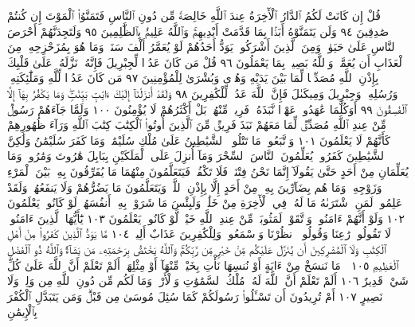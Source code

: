 قُلْ إِن كَانَتْ لَكُمُ ٱلدَّارُ ٱلْأٓخِرَةُ عِندَ ٱللَّهِ خَالِصَةࣰ مِّن
دُونِ ٱلنَّاسِ فَتَمَنَّوُا۟ ٱلْمَوْتَ إِن كُنتُمْ صَٰدِقِينَ ٩٤ وَلَن
يَتَمَنَّوْهُ أَبَدَۢا بِمَا قَدَّمَتْ أَيْدِيهِمْۚ وَٱللَّهُ عَلِيمُۢ بِٱلظَّٰلِمِينَ ٩٥
وَلَتَجِدَنَّهُمْ أَحْرَصَ ٱلنَّاسِ عَلَىٰ حَيَوٰةࣲ وَمِنَ ٱلَّذِينَ أَشْرَكُوا۟ۚ
يَوَدُّ أَحَدُهُمْ لَوْ يُعَمَّرُ أَلْفَ سَنَةࣲ وَمَا هُوَ بِمُزَحْزِحِهِۦ مِنَ
ٱلْعَذَابِ أَن يُعَمَّرَۗ وَٱللَّهُ بَصِيرُۢ بِمَا يَعْمَلُونَ ٩٦ قُلْ مَن
كَانَ عَدُوࣰّا لِّجِبْرِيلَ فَإِنَّهُۥ نَزَّلَهُۥ عَلَىٰ قَلْبِكَ بِإِذْنِ
ٱللَّهِ مُصَدِّقࣰا لِّمَا بَيْنَ يَدَيْهِ وَهُدࣰى وَبُشْرَىٰ لِلْمُؤْمِنِينَ ٩٧
مَن كَانَ عَدُوࣰّا لِّلَّهِ وَمَلَٰٓئِكَتِهِۦ وَرُسُلِهِۦ وَجِبْرِيلَ
وَمِيكَىٰلَ فَإِنَّ ٱللَّهَ عَدُوࣱّ لِّلْكَٰفِرِينَ ٩٨ وَلَقَدْ أَنزَلْنَآ
إِلَيْكَ ءَايَٰتِۭ بَيِّنَٰتࣲۖ وَمَا يَكْفُرُ بِهَآ إِلَّا ٱلْفَٰسِقُونَ ٩٩
أَوَكُلَّمَا عَٰهَدُوا۟ عَهْدࣰا نَّبَذَهُۥ فَرِيقࣱ مِّنْهُمۚ بَلْ أَكْثَرُهُمْ
لَا يُؤْمِنُونَ ١٠٠ وَلَمَّا جَآءَهُمْ رَسُولࣱ مِّنْ عِندِ ٱللَّهِ مُصَدِّقࣱ
لِّمَا مَعَهُمْ نَبَذَ فَرِيقࣱ مِّنَ ٱلَّذِينَ أُوتُوا۟ ٱلْكِتَٰبَ
كِتَٰبَ ٱللَّهِ وَرَآءَ ظُهُورِهِمْ كَأَنَّهُمْ لَا يَعْلَمُونَ ١٠١
وَٱتَّبَعُوا۟ مَا تَتْلُوا۟ ٱلشَّيَٰطِينُ عَلَىٰ مُلْكِ سُلَيْمَٰنَۖ وَمَا كَفَرَ
سُلَيْمَٰنُ وَلَٰكِنَّ ٱلشَّيَٰطِينَ كَفَرُوا۟ يُعَلِّمُونَ ٱلنَّاسَ
ٱلسِّحْرَ وَمَآ أُنزِلَ عَلَى ٱلْمَلَكَيْنِ بِبَابِلَ هَٰرُوتَ وَمَٰرُوتَۚ
وَمَا يُعَلِّمَانِ مِنْ أَحَدٍ حَتَّىٰ يَقُولَآ إِنَّمَا نَحْنُ فِتْنَةࣱ فَلَا
تَكْفُرْۖ فَيَتَعَلَّمُونَ مِنْهُمَا مَا يُفَرِّقُونَ بِهِۦ بَيْنَ ٱلْمَرْءِ
وَزَوْجِهِۦۚ وَمَا هُم بِضَآرِّينَ بِهِۦ مِنْ أَحَدٍ إِلَّا بِإِذْنِ ٱللَّهِۚ
وَيَتَعَلَّمُونَ مَا يَضُرُّهُمْ وَلَا يَنفَعُهُمْۚ وَلَقَدْ عَلِمُوا۟ لَمَنِ
ٱشْتَرَىٰهُ مَا لَهُۥ فِي ٱلْأٓخِرَةِ مِنْ خَلَٰقࣲۚ وَلَبِئْسَ مَا شَرَوْا۟ بِهِۦٓ
أَنفُسَهُمْۚ لَوْ كَانُوا۟ يَعْلَمُونَ ١٠٢ وَلَوْ أَنَّهُمْ ءَامَنُوا۟ وَٱتَّقَوْا۟
لَمَثُوبَةࣱ مِّنْ عِندِ ٱللَّهِ خَيْرࣱۚ لَّوْ كَانُوا۟ يَعْلَمُونَ ١٠٣
يَٰٓأَيُّهَا ٱلَّذِينَ ءَامَنُوا۟ لَا تَقُولُوا۟ رَٰعِنَا وَقُولُوا۟ ٱنظُرْنَا
وَٱسْمَعُوا۟ۗ وَلِلْكَٰفِرِينَ عَذَابٌ أَلِيمࣱ ١٠٤ مَّا يَوَدُّ
ٱلَّذِينَ كَفَرُوا۟ مِنْ أَهْلِ ٱلْكِتَٰبِ وَلَا ٱلْمُشْرِكِينَ
أَن يُنَزَّلَ عَلَيْكُم مِّنْ خَيْرࣲ مِّن رَّبِّكُمْۚ وَٱللَّهُ يَخْتَصُّ
بِرَحْمَتِهِۦ مَن يَشَآءُۚ وَٱللَّهُ ذُو ٱلْفَضْلِ ٱلْعَظِيمِ ١٠٥
۞ مَا نَنسَخْ مِنْ ءَايَةٍ أَوْ نُنسِهَا نَأْتِ بِخَيْرࣲ مِّنْهَآ أَوْ مِثْلِهَآۗ
أَلَمْ تَعْلَمْ أَنَّ ٱللَّهَ عَلَىٰ كُلِّ شَيْءࣲ قَدِيرٌ ١٠٦ أَلَمْ تَعْلَمْ أَنَّ
ٱللَّهَ لَهُۥ مُلْكُ ٱلسَّمَٰوَٰتِ وَٱلْأَرْضِۗ وَمَا لَكُم مِّن دُونِ
ٱللَّهِ مِن وَلِيࣲّ وَلَا نَصِيرٍ ١٠٧ أَمْ تُرِيدُونَ أَن تَسْـَٔلُوا۟ رَسُولَكُمْ
كَمَا سُئِلَ مُوسَىٰ مِن قَبْلُۗ وَمَن يَتَبَدَّلِ ٱلْكُفْرَ بِٱلْإِيمَٰنِ
